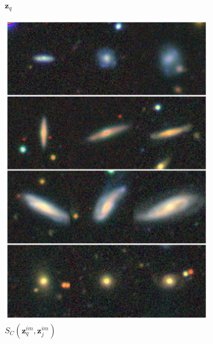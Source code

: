 \documentclass[a4paper,12pt]{article}
\begin{document}
\begin{figure}[H]
\begin{subfigure}{0.08\textwidth}
        \caption{$\mathbf{z}_q$}
        \label{fig:retrieval_1}
    \end{subfigure}%
    \hfill
    \begin{subfigure}{0.22\textwidth}
        \centering
        \includegraphics[height=0.21\textheight]{../figures/images_im_im.png}
        \caption{$S_C(\mathbf{z}_q^{im}, \mathbf{z}_j^{im})$}
        \label{fig:retrieval_2}
    \end{subfigure}%
    \hfill
    \begin{subfigure}{0.22\textwidth}
        \centering

\end{subfigure}
\end{figure}
\end{document}
